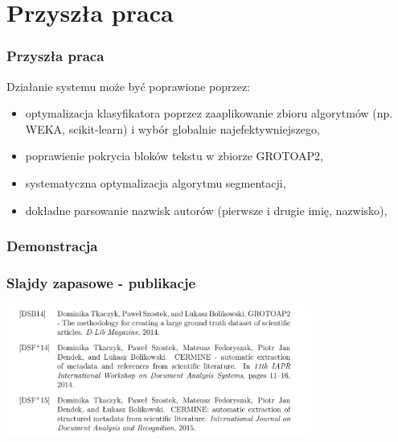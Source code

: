 \documentclass[11pt,t]{beamer}
\begin{document}
\section{Przyszła praca}
\begin{frame}
\frametitle{Przyszła praca}
Działanie systemu może być poprawione poprzez:
\begin{itemize}
\item optymalizacja klasyfikatora poprzez zaaplikowanie zbioru algorytmów (np. WEKA, scikit-learn) i wybór globalnie najefektywniejszego,
\item poprawienie pokrycia bloków tekstu w zbiorze GROTOAP2,
\item systematyczna optymalizacja algorytmu segmentacji,
\item dokładne parsowanie nazwisk autorów (pierwsze i drugie imię, nazwisko),
\end{itemize}
\end{frame}
\begin{frame}
\frametitle{Demonstracja}
\end{frame}
\begin{frame}
\frametitle{Slajdy zapasowe - publikacje}
\centering
\includegraphics[width=10cm]{cit.png}

\end{frame}
\end{document}
